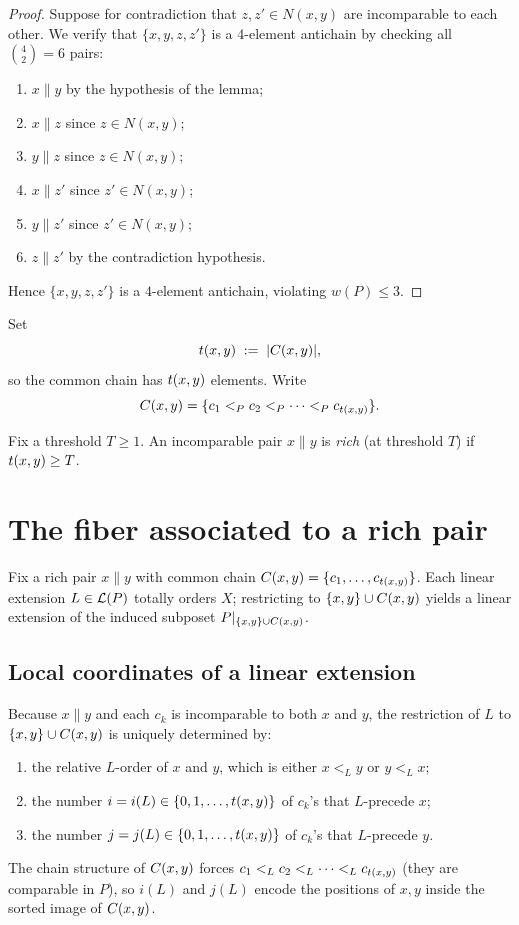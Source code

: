 \begin{proof}
Suppose for contradiction that $z,z'\in N(x,y)$ are incomparable to each other. We verify that $\{x,y,z,z'\}$ is a $4$-element antichain by checking all $\binom{4}{2}=6$ pairs:
\begin{enumerate}[label=(\roman*),nosep]
\item $x\parallel y$ by the hypothesis of the lemma;
\item $x\parallel z$ since $z\in N(x,y)$;
\item $y\parallel z$ since $z\in N(x,y)$;
\item $x\parallel z'$ since $z'\in N(x,y)$;
\item $y\parallel z'$ since $z'\in N(x,y)$;
\item $z\parallel z'$ by the contradiction hypothesis.
\end{enumerate}
Hence $\{x,y,z,z'\}$ is a $4$-element antichain, violating $w(P)\le 3$.
\end{proof}

Set
\[
t(x,y) \;:=\; |C(x,y)|,
\]
so the common chain has $t(x,y)$ elements. Write
\[
C(x,y)=\{c_1<_P c_2<_P\dots <_P c_{t(x,y)}\}.
\]

\begin{definition}\label{def:rich}
Fix a threshold $T\ge 1$.
An incomparable pair $x\parallel y$ is \emph{rich} (at threshold $T$) if $t(x,y)\ge T$.
\end{definition}

\section{The fiber associated to a rich pair}

Fix a rich pair $x\parallel y$ with common chain $C(x,y)=\{c_1,\dots,c_{t(x,y)}\}$.
Each linear extension $L\in\mathcal{L}(P)$ totally orders $X$; restricting to
$\{x,y\}\cup C(x,y)$ yields a linear extension of the induced subposet
$P|_{\{x,y\}\cup C(x,y)}$.

\subsection{Local coordinates of a linear extension}

Because $x\parallel y$ and each $c_k$ is incomparable to both $x$ and $y$,
the restriction of $L$ to $\{x,y\}\cup C(x,y)$ is uniquely determined by:
\begin{enumerate}[label=(\alph*),nosep]
\item the relative $L$-order of $x$ and $y$, which is either $x<_L y$ or $y<_L x$;
\item the number $i=i(L)\in\{0,1,\dots,t(x,y)\}$ of $c_k$'s that $L$-precede $x$;
\item the number $j=j(L)\in\{0,1,\dots,t(x,y)\}$ of $c_k$'s that $L$-precede $y$.
\end{enumerate}
The chain structure of $C(x,y)$ forces $c_1<_L c_2<_L\dots<_L c_{t(x,y)}$ (they are
comparable in $P$), so $i(L)$ and $j(L)$ encode the positions of $x,y$ inside
the sorted image of $C(x,y)$.

